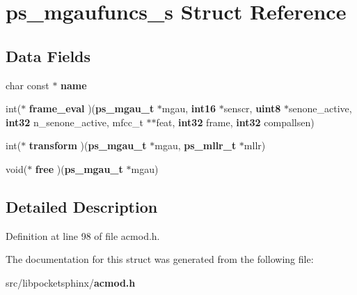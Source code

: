 \section{ps\-\_\-mgaufuncs\-\_\-s \-Struct \-Reference}
\label{structps__mgaufuncs__s}
\subsection*{\-Data \-Fields}
\begin{DoxyCompactItemize}
\item 
char const $\ast$ {\bfseries name}\label{structps__mgaufuncs__s_a5f3570efd5d8a41003b9628663e66b4c}

\item 
int($\ast$ {\bfseries frame\-\_\-eval} )({\bf ps\-\_\-mgau\-\_\-t} $\ast$mgau, {\bf int16} $\ast$senscr, {\bf uint8} $\ast$senone\-\_\-active, {\bf int32} n\-\_\-senone\-\_\-active, mfcc\-\_\-t $\ast$$\ast$feat, {\bf int32} frame, {\bf int32} compallsen)\label{structps__mgaufuncs__s_a48d7877641444381ce3eed04749d4d38}

\item 
int($\ast$ {\bfseries transform} )({\bf ps\-\_\-mgau\-\_\-t} $\ast$mgau, {\bf ps\-\_\-mllr\-\_\-t} $\ast$mllr)\label{structps__mgaufuncs__s_aecb9544f91afbff29bf1daa9b6cf32f1}

\item 
void($\ast$ {\bfseries free} )({\bf ps\-\_\-mgau\-\_\-t} $\ast$mgau)\label{structps__mgaufuncs__s_a6b841e50f993e81030471b2982e45be6}

\end{DoxyCompactItemize}


\subsection{\-Detailed \-Description}


\-Definition at line 98 of file acmod.\-h.



\-The documentation for this struct was generated from the following file\-:\begin{DoxyCompactItemize}
\item 
src/libpocketsphinx/{\bf acmod.\-h}\end{DoxyCompactItemize}
